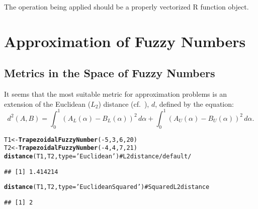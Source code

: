 \documentclass[11pt]{article}\usepackage{graphicx, color}
\makeatletter
\newcommand{\hlfunctioncall}[1]{\textcolor[rgb]{0.501960784313725,0,0.329411764705882}{\textbf{#1}}}%
\newcommand{\hlstring}[1]{\textcolor[rgb]{0.6,0.6,1}{#1}}%
\newcommand{\hlcomment}[1]{\textcolor[rgb]{0.180392156862745,0.6,0.341176470588235}{#1}}%
\newenvironment{kframe}{%
 \def\at@end@of@kframe{}%
 \ifinner\ifhmode%
  \def\at@end@of@kframe{\end{minipage}}%
  \begin{minipage}{\columnwidth}%
 \fi\fi%
 \def\FrameCommand##1{\hskip\@totalleftmargin \hskip-\fboxsep
 \colorbox{shadecolor}{##1}\hskip-\fboxsep
     \hskip-\linewidth \hskip-\@totalleftmargin \hskip\columnwidth}%
 \MakeFramed {\advance\hsize-\width
   \@totalleftmargin\z@ \linewidth\hsize
   \@setminipage}}%
 {\par\unskip\endMakeFramed%
 \at@end@of@kframe}
\newenvironment{knitrout}{}{} %
\newcommand{\lang}[1]{\textsf{#1}\xspace}
\newcommand{\R}{\lang{R}}
\makeatother
\begin{document}
\noindent
The operation being applied should be a properly
vectorized \R function object.









\section{Approximation of Fuzzy Numbers}\label{Sec:Approximation}


\subsection{Metrics in the Space of Fuzzy Numbers}

It seems that the most suitable metric for approximation problems
is an extension of the Euclidean ($L_2$) distance
(cf.~\cite{Grzegorzewski1998}), $d$, defined by the equation:
\begin{equation}
d^2(A,B) = \int_0^1 \left(A_L(\alpha)-B_L(\alpha)\right)^2\,d\alpha
         + \int_0^1 \left(A_U(\alpha)-B_U(\alpha)\right)^2\,d\alpha.
\end{equation}


\begin{knitrout}\small
{}\color{fgcolor}\begin{kframe}
\begin{alltt}
T1 <- \hlfunctioncall{TrapezoidalFuzzyNumber}(-5, 3, 6, 20)
T2 <- \hlfunctioncall{TrapezoidalFuzzyNumber}(-4, 4, 7, 21)
\hlfunctioncall{distance}(T1, T2, type=\hlstring{'Euclidean'}) \hlcomment{# L2 distance /default/}
\end{alltt}
\begin{verbatim}
## [1] 1.414214
\end{verbatim}
\begin{alltt}
\hlfunctioncall{distance}(T1, T2, type=\hlstring{'EuclideanSquared'}) \hlcomment{# Squared L2 distance}
\end{alltt}
\begin{verbatim}
## [1] 2
\end{verbatim}
\end{kframe}
\end{knitrout}
\end{document}
